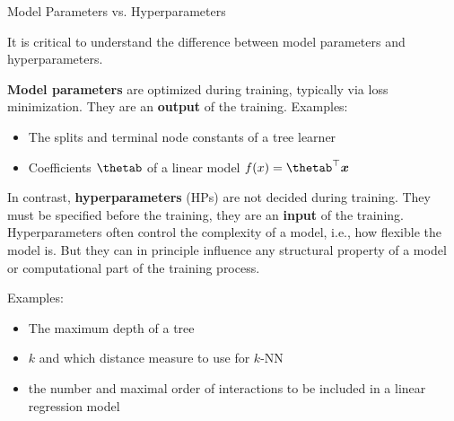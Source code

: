\documentclass[11pt,compress,t,notes=noshow, xcolor=table]{beamer}
\begin{document}



\begin{vbframe}{Model Parameters vs. Hyperparameters}

It is critical to understand the difference between model parameters and hyperparameters. 

\lz

\textbf{Model parameters} are optimized during training, typically via loss minimization. They are an \textbf{output} of the training. Examples:
\begin{itemize}
\item The splits and terminal node constants of a tree learner 
\item Coefficients $\thetab$ of a linear model $\fx = \thetab^\top\xv$
\end{itemize}

\framebreak
  
In contrast, \textbf{hyperparameters} (HPs) are not decided during training. They must be specified before the training, they are an \textbf{input} of the training. 
Hyperparameters often control the complexity of a model, i.e., how flexible the model is.
But they can in principle influence any structural property of a model or computational part of the training process.

\lz

Examples:

\begin{itemize}
\item The maximum depth of a tree 
\item $k$ and which distance measure to use for $k$-NN
\item the number and maximal order of interactions to be included in a linear regression model
\end{itemize}

\end{vbframe}
\end{document}
